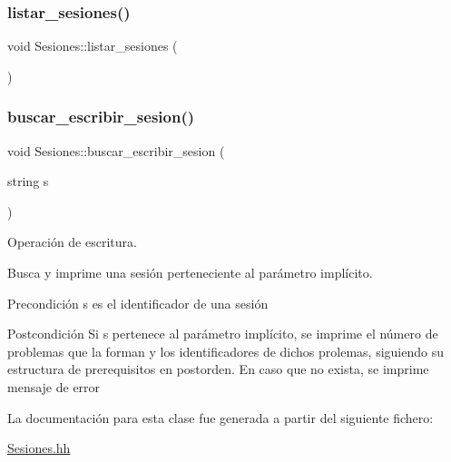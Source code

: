 \mbox{\label{class_sesiones_a438bfbd4a37db2f08433c49d451d3e72}} 
\subsubsection{\texorpdfstring{listar\+\_\+sesiones()}{listar\_sesiones()}}
{\footnotesize\ttfamily void Sesiones\+::listar\+\_\+sesiones (\begin{DoxyParamCaption}{ }\end{DoxyParamCaption})}

\mbox{\label{class_sesiones_a2ade13f47c028e41888540c4f03449b6}} 
\subsubsection{\texorpdfstring{buscar\+\_\+escribir\+\_\+sesion()}{buscar\_escribir\_sesion()}}
{\footnotesize\ttfamily void Sesiones\+::buscar\+\_\+escribir\+\_\+sesion (\begin{DoxyParamCaption}\item[{string}]{s }\end{DoxyParamCaption})}



Operación de escritura. 

Busca y imprime una sesión perteneciente al parámetro implícito. \begin{DoxyPrecond}{Precondición}
s es el identificador de una sesión 
\end{DoxyPrecond}
\begin{DoxyPostcond}{Postcondición}
Si s pertenece al parámetro implícito, se imprime el número de problemas que la forman y los identificadores de dichos prolemas, siguiendo su estructura de prerequisitos en postorden. En caso que no exista, se imprime mensaje de error 
\end{DoxyPostcond}


La documentación para esta clase fue generada a partir del siguiente fichero\+:\begin{DoxyCompactItemize}
\item 
\mbox{\hyperlink{_sesiones_8hh}{Sesiones.\+hh}}\end{DoxyCompactItemize}
